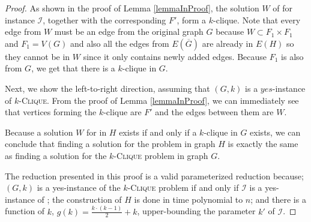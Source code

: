 \begin{proof}
    As shown in the proof of Lemma \ref{lemmaInProof}, the solution $W$ of \HLshort for instance $\mathcal{I}$,
    together with the corresponding $F'$, form a $k$-clique.
    Note that every edge from $W$ must be an edge from the original graph $G$ because $W \subset F_1 \times F_1$ and $F_1 = V(G)$
    and also all the edges from $E(\overline{G})$ are already in $E(H)$ so they cannot be in $W$ since it only contains newly added edges.
    Because $F_1$ is also from $G$, we get that there is a $k$-clique in $G$.

    Next, we show the left-to-right direction, assuming that $(G, k)$ is a $yes$-instance of $k$-\textsc{Clique}.
    From the proof of Lemma \ref{lemmaInProof}, we can immediately see that
    vertices forming the $k$-clique are $F'$ and the edges between them are $W$. 

    Because a solution $W$ for \HLshort in $H$ exists if and only if a $k$-clique in $G$ exists,
    we can conclude that finding a solution for the \HL problem in graph $H$ is exactly the same as
    finding a solution for the $k$-\textsc{Clique} problem in graph $G$.

    The reduction presented in this proof is a valid parameterized reduction because;
    $(G, k)$ is a yes-instance of the $k$-\textsc{Clique} problem if and only if $\mathcal{I}$ is a yes-instance of \HLdeg;
    the construction of $H$ is done in time polynomial to $n$;
    and there is a function of $k$, $g(k) = \frac{k\cdot(k-1)}{2} + k$, upper-bounding the parameter $k'$ of $\mathcal{I}$.
\end{proof}

